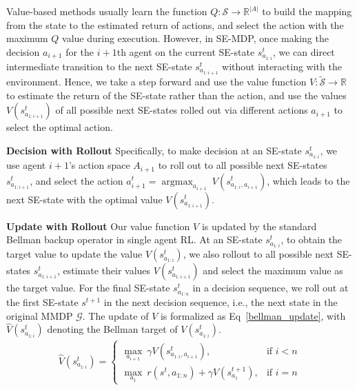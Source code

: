\documentclass[letterpaper]{article} \usepackage{aaai23}  \usepackage{times}  \usepackage{helvet}  \usepackage{courier}  \usepackage[hyphens]{url}  \usepackage{graphicx} \urlstyle{rm} \def\UrlFont{\rm}  \usepackage{natbib}  \usepackage{caption} \frenchspacing  \setlength{\pdfpagewidth}{8.5in} \setlength{\pdfpageheight}{11in} \usepackage{algorithm}
\begin{document}
Value-based methods usually learn the function $Q: \mathcal{S} \rightarrow \mathbb{R}^{\left| A \right|}$ to build the mapping from the state to the estimated return of actions, and select the action with the maximum $Q$ value during execution. However, in SE-MDP, once making the decision $a_{i+1}$ for the $i+1$th agent on the current SE-state $s_{a_{1:i}}^t$, we can direct intermediate transition to the next SE-state $s_{a_{1:i+1}}^t$ without interacting with the environment. Hence, we take a step forward and use the value function $V: \widetilde{\mathcal{S}} \rightarrow \mathbb{R}$ to estimate the return of the SE-state rather than the action, and use the values $V\left(s_{a_{1:i+1}}^t\right)$ of all possible next SE-states rolled out via different actions $a_{i+1}$ to select the optimal action.

\textbf{Decision with Rollout} Specifically, to make decision at an SE-state $s_{a_{1:i}}^t$, we use agent $i+1$'s action space $A_{i+1}$ to roll out to all possible next SE-states $s_{a_{1:{i+1}}}^t$, and select the action $a_{i+1}^t = \mathop{\arg\max}_{a_{i+1}} \ V\left(s_{a_{1:i}, a_{i+1}}^t\right)$, which leads to the next SE-state with the optimal value $V\left(s_{a_{1:i+1}}^t\right)$.

\textbf{Update with Rollout} Our value function $V$ is updated by the standard Bellman backup operator in single agent RL. At an SE-state $s_{a_{1:i}}^t$, to obtain the target value to update the value $V\left(s_{a_{1:i}}^t\right)$, we also rollout to all possible next SE-states $s_{a_{1:{i+1}}}^t$, estimate their values $V\left(s_{a_{1:i+1}}^t\right)$ and select the maximum value as the target value. For the final SE-state $s_{a_{1:{n}}}^t$ in a decision sequence, we roll out at the first SE-state $s^{t+1}$ in the next decision sequence, i.e., the next state in the original MMDP $\mathcal{G}$. The update of $V$ is formalized as Eq~\ref{bellman_update}, with $\hat{V}\left(s_{a_{1:i}}^t\right)$ denoting the Bellman target of $V\left(s_{a_{1:i}}^t\right)$.
\begin{gather}
\label{bellman_update}
    \hat{V}\left(s_{a_{1:i}}^t\right)=
    \begin{cases}
        \mathop{\max}_{a_{i+1}} \ \gamma V\left(s_{a_{1:i}, a_{i+1}}^t\right),  & \text{if $i < n$} \\
        \mathop{\max}_{a_{1}} \ r\left(s^t,a_{1:n}\right)
         + \gamma V\left(s_{a_{1}}^{t+1}\right), & \text{if $i = n$}
    \end{cases}
\end{gather}
\vspace{-4mm}
\vspace{-1ex}
\end{document}
